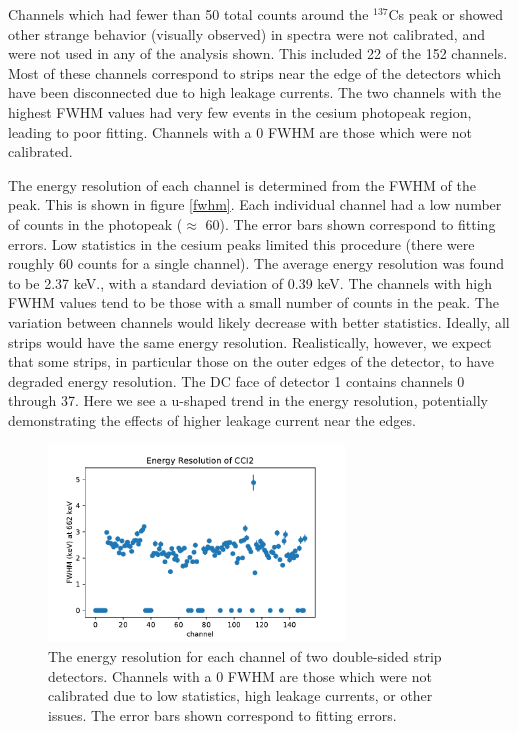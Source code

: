 Channels which had fewer than 50 total counts around the ${}^{137}$Cs peak or showed other strange behavior (visually observed) in spectra were not calibrated, and were not used in any of the analysis shown. This included 22 of the 152 channels. Most of these channels correspond to strips near the edge of the detectors which have been disconnected due to high leakage currents. The two channels with the highest FWHM values had very few events in the cesium photopeak region, leading to poor fitting. Channels with a 0 FWHM are those which were not calibrated.

The energy resolution of each channel is determined from the FWHM of the peak. This is shown in figure \ref{fwhm}. Each individual channel had a low number of counts in the photopeak ($\approx$ 60). The error bars shown correspond to fitting errors. Low statistics in the cesium peaks limited this procedure (there were roughly 60 counts for a single channel). The average energy resolution was found to be 2.37 keV., with a standard deviation of 0.39 keV. The channels with high FWHM values tend to be those with a small number of counts in the peak. The variation between channels would likely decrease with better statistics. Ideally, all strips would have the same energy resolution. Realistically, however, we expect that some strips, in particular those on the outer edges of the detector, to have degraded energy resolution. The DC face of detector 1 contains channels 0 through 37. Here we see a u-shaped trend in the energy resolution, potentially demonstrating the effects of higher leakage current near the edges.

\begin{figure}
\begin{centering}
\includegraphics[width=0.7\textwidth]{./figures/energy_res_long.pdf}
\caption{The energy resolution for each channel of two double-sided strip detectors. Channels with a 0 FWHM are those which were not calibrated due to low statistics, high leakage currents, or other issues. The error bars shown correspond to fitting errors.}
\label{fwhm_long}
\end{centering}
\end{figure}

